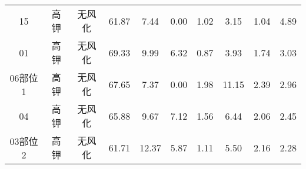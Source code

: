 \documentclass[withoutpreface,bwprint]{cumcmthesis} %
\begin{document}
\begin{appendices}
\begin{table}[!h]
\begin{tabular}{@{}cccccccccc@{}}
		15                                                        & 高钾          & 无风化                                                      & 61.87                                                          & 7.44                                                         & 0.00                                                         & 1.02                                                         & 3.15                                                           & 1.04                                                           & 4.89                                                            \\
		01                                                        & 高钾          & 无风化                                                      & 69.33                                                          & 9.99                                                         & 6.32                                                         & 0.87                                                         & 3.93                                                           & 1.74                                                           & 3.03                                                            \\
		06部位1                                                     & 高钾          & 无风化                                                      & 67.65                                                          & 7.37                                                         & 0.00                                                         & 1.98                                                         & 11.15                                                          & 2.39                                                           & 2.96                                                            \\
		04                                                        & 高钾          & 无风化                                                      & 65.88                                                          & 9.67                                                         & 7.12                                                         & 1.56                                                         & 6.44                                                           & 2.06                                                           & 2.45                                                            \\
		03部位2                                                     & 高钾          & 无风化                                                      & 61.71                                                          & 12.37                                                        & 5.87                                                         & 1.11                                                         & 5.50                                                           & 2.16                                                           & 2.28                                                            \\

\end{tabular}
\end{table}
\end{appendices}
\end{document}
